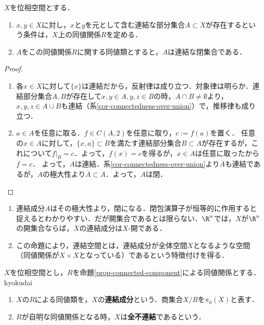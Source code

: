 \documentclass[uplatex,dvipdfmx]{jsreport}
\begin{document}
\begin{proposition}[極大の連結部分集合は同値類である]\label{prop-connected-component}
    $X$を位相空間とする．
    \begin{enumerate}
        \item $x,y\in X$に対し，$x$と$y$を元として含む連結な部分集合$A\subset X$が存在するという条件は，$X$上の同値関係$R$を定める．
        \item $A$をこの同値関係$R$に関する同値類とすると，$A$は連結な閉集合である．
    \end{enumerate}
\end{proposition}
\begin{proof}\mbox{}
    \begin{enumerate}
        \item 各$x\in X$に対して$\{x\}$は連結だから，反射律は成り立つ．対象律は明らか．連結部分集合$A,B$が存在して$x,y\in A,y,z\in B$の時，$A\cap B\ne\emptyset$より，$x,y,z\in A\cup B$も連結（系\ref{cor-connectedness-over-union}）で，推移律も成り立つ．
        \item $a\in A$を任意に取る．$f\in C(A,2)$を任意に取り，$c:=f(a)$を置く．
        任意の$x\in A$に対して，$\{x,a\}\subset B$を満たす連結部分集合$B\subset A$が存在するが，これについて$f|_B=c$．よって，$f(x)=c$を得るが，$x\in A$は任意に取ったから$f=c$．
        よって，$A$は連結．系\ref{cor-connectedness-over-union}より$\overline{A}$も連結であるが，$A$の極大性より$\overline{A}\subset A$．よって，$A$は閉．
    \end{enumerate}
\end{proof}
\begin{remarks}\mbox{}
    \begin{enumerate}
        \item 連結成分$A$はその極大性より，閉になる．閉包演算子が恒等的に作用すると捉えるとわかりやすい．だが開集合であるとは限らない．$\R^n$では，$X$が$\R^n$の開集合ならば，$X$の連結成分は$X$-開である．
        \item この命題により，連結空間とは，連結成分が全体空間$X$となるような空間（同値関係が$X\times X$となっている）であるという特徴付けを得る．
    \end{enumerate}
\end{remarks}

\begin{definition}
    $X$を位相空間とし，$R$を命題\ref{prop-connected-component}による同値関係とする．kyokudai
    \begin{enumerate}
        \item $X$の$R$による同値類を，$X$の\textbf{連結成分}という．商集合$X/R$を$\pi_0(X)$と表す．
        \item $R$が自明な同値関係となる時，$X$は\textbf{全不連結}であるという．
    \end{enumerate}
\end{definition}
\end{document}
